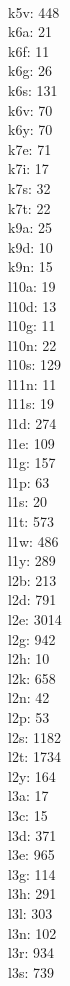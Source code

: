 \begin{multicols}{8}
  \\k5v: 448
  \\k6a: 21
  \\k6f: 11
  \\k6g: 26
  \\k6s: 131
  \\k6v: 70
  \\k6y: 70
  \\k7e: 71
  \\k7i: 17
  \\k7s: 32
  \\k7t: 22
  \\k9a: 25
  \\k9d: 10
  \\k9n: 15
  \\l10a: 19
  \\l10d: 13
  \\l10g: 11
  \\l10n: 22
  \\l10s: 129
  \\l11n: 11
  \\l11s: 19
  \\l1d: 274
  \\l1e: 109
  \\l1g: 157
  \\l1p: 63
  \\l1s: 20
  \\l1t: 573
  \\l1w: 486
  \\l1y: 289
  \\l2b: 213
  \\l2d: 791
  \\l2e: 3014
  \\l2g: 942
  \\l2h: 10
  \\l2k: 658
  \\l2n: 42
  \\l2p: 53
  \\l2s: 1182
  \\l2t: 1734
  \\l2y: 164
  \\l3a: 17
  \\l3c: 15
  \\l3d: 371
  \\l3e: 965
  \\l3g: 114
  \\l3h: 291
  \\l3l: 303
  \\l3n: 102
  \\l3r: 934
  \\l3s: 739

\end{multicols}
